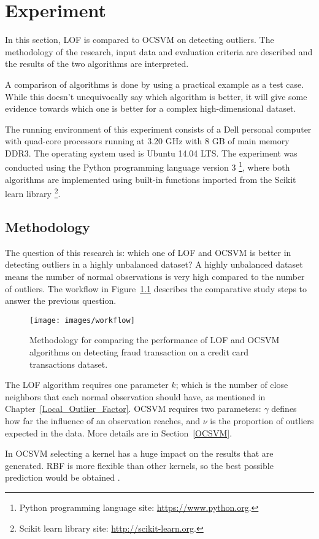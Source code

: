 \chapter{Experiment} \label{Experiment}
In this section, LOF is compared to OCSVM on detecting outliers. The methodology of the research, input data and evaluation criteria are described and the results of the two algorithms are interpreted.

A comparison of algorithms is done by using a practical example as a test case. While this doesn't unequivocally say which algorithm is better, it will give some evidence towards which one is better for a complex high-dimensional dataset.

The running environment of this experiment consists of a Dell personal computer with quad-core processors running at 3.20 GHz with 8 GB of main memory DDR3. The operating system used is Ubuntu 14.04 LTS. The experiment was conducted using the Python programming language version 3 \footnote{Python programming language site: \url{https://www.python.org}.}, where both algorithms are implemented using built-in functions imported from the Scikit learn library
\footnote{Scikit learn library site: \url{http://scikit-learn.org}.}.
\section{Methodology}
The question of this research is: which one of LOF and OCSVM is better in detecting outliers in a highly unbalanced dataset? A highly unbalanced dataset means the number of normal observations is very high compared to the number of outliers. The workflow in Figure~\ref{workflow} describes the comparative study steps to answer the previous question.
\begin{figure}[!h]
\centering 
\texttt{[image: images/workflow]}
\caption{Methodology for comparing the performance of LOF and OCSVM algorithms on detecting fraud transaction on a credit card transactions dataset.}
\label{workflow} 
\end{figure}

The LOF algorithm requires one parameter $k$; which is the number of close neighbors that each normal observation should have, as mentioned in Chapter~\ref{Local_Outlier_Factor}. OCSVM requires two parameters: $\gamma$ defines how far the influence of an observation reaches, and $\nu$ is the proportion of outliers expected in the data. More details are in Section~\ref{OCSVM}.

In OCSVM selecting a kernel has a huge impact on the results that are generated. RBF is more flexible than other kernels, so the best possible prediction would be obtained \citep{RBFkernel}.


